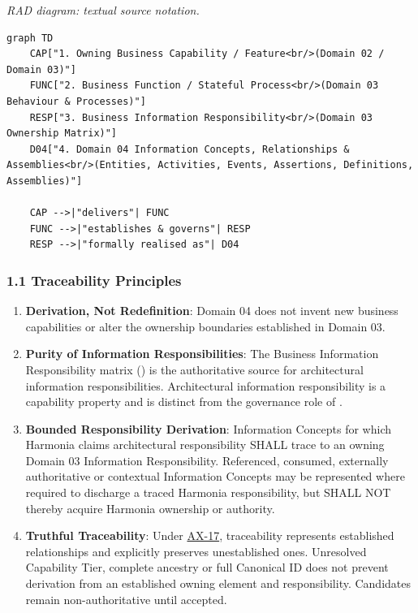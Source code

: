 \textit{RAD diagram: textual source notation.}
\begin{Verbatim}[breaklines,fontsize=\footnotesize]
graph TD
    CAP["1. Owning Business Capability / Feature<br/>(Domain 02 / Domain 03)"]
    FUNC["2. Business Function / Stateful Process<br/>(Domain 03 Behaviour & Processes)"]
    RESP["3. Business Information Responsibility<br/>(Domain 03 Ownership Matrix)"]
    D04["4. Domain 04 Information Concepts, Relationships & Assemblies<br/>(Entities, Activities, Events, Assertions, Definitions, Assemblies)"]

    CAP -->|"delivers"| FUNC
    FUNC -->|"establishes & governs"| RESP
    RESP -->|"formally realised as"| D04
\end{Verbatim}
\label{rad:traceability:33}
\subsubsection*{1.1 Traceability Principles}
\label{rad:traceability:34}

\begin{enumerate}

\item 
\textbf{Derivation, Not Redefinition}: Domain 04 does not invent new business capabilities or alter the ownership boundaries established in Domain 03.



\item 
\textbf{Purity of Information Responsibilities}: The Business Information Responsibility matrix (\texttt{}) is the authoritative source for architectural information responsibilities. Architectural information responsibility is a capability property and is distinct from the governance role of \texttt{}.



\item 
\textbf{Bounded Responsibility Derivation}: Information Concepts for which Harmonia claims architectural responsibility SHALL trace to an owning Domain 03 Information Responsibility. Referenced, consumed, externally authoritative or contextual Information Concepts may be represented where required to discharge a traced Harmonia responsibility, but SHALL NOT thereby acquire Harmonia ownership or authority.



\item 
\textbf{Truthful Traceability}: Under \href{https://github.com/fhirfactory/harmonia/blob/98410db60155198a75f74c79d98060070209faa1/docs/markdown/governance/architectural-axioms.md\#ax-17}{AX-17}, traceability represents established relationships and explicitly preserves unestablished ones. Unresolved Capability Tier, complete ancestry or full Canonical ID does not prevent derivation from an established owning element and responsibility. Candidates remain non-authoritative until accepted.



\end{enumerate}
\label{rad:traceability:39}

